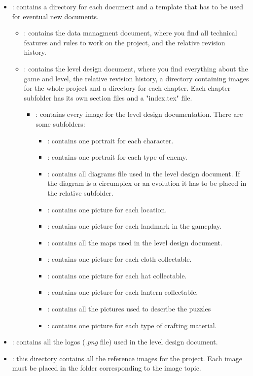 \begin{itemize}
\item \textbf{}: contains a directory for each document and a template that has to be used for eventual new documents.
  \begin{itemize}
    \item \textbf{}: contains the data managment document, where you find all technical features and rules to work on the project, and the relative revision history.

    \item \textbf{}: contains the level design document, where you find everything about the game and level, the relative revision history, a directory containing images for the whole project and a directory for each chapter. Each chapter subfolder has its own section files and a "index.tex" file.
    \begin{itemize}
    \item \textbf{}: contains every image for the level design documentation. There are some subfolders:
    \begin{itemize}
    \item \textbf{}: contains one portrait for each character.
      \item \textbf{}: contains one portrait for each type of enemy.
      \item \textbf{}: contains all diagrams file used in the level design document. If the diagram is a circumplex or an evolution it has to be placed in the relative subfolder.
      \item \textbf{}: contains one picture for each location.
        \item \textbf{}: contains one picture for each landmark in the gameplay.
        \item \textbf{}: contains all the maps used in the level design document.
        \item \textbf{}: contains one picture for each cloth collectable.
        \item \textbf{}: contains one picture for each hat collectable.
        \item \textbf{}: contains one picture for each lantern collectable.
        \item \textbf{}: contains all the pictures used to describe the puzzles 
        \item \textbf{}: contains one picture for each type of crafting material.
    \end{itemize}
\end{itemize}
\end{itemize}
    \item \textbf{}: contains all the logos (\textit{.png} file) used in the level design document.

    \item \textbf{}: this directory contains all the reference images for the project. Each image must be placed in the folder corresponding to the image topic.

\end{itemize}

